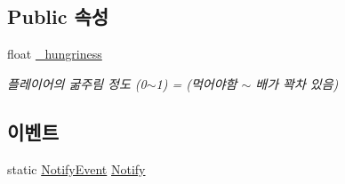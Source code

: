 \subsection*{Public 속성}
\begin{DoxyCompactItemize}
\item 
float \mbox{\hyperlink{class_player_controller_ab4fed78a016e8baca12e50bb3d7f034a}{\+\_\+hungriness}}
\begin{DoxyCompactList}\small\item\em 플레이어의 굶주림 정도 (0$\sim$1) = (먹어야함 $\sim$ 배가 꽉차 있음) \end{DoxyCompactList}\end{DoxyCompactItemize}
\subsection*{이벤트}
\begin{DoxyCompactItemize}
\item 
static \mbox{\hyperlink{class_player_controller_a934c7f80b80276620cd60eaaeea7520e}{Notify\+Event}} \mbox{\hyperlink{class_player_controller_af13292e01756741118500035511fc88d}{Notify}}
\end{DoxyCompactItemize}
